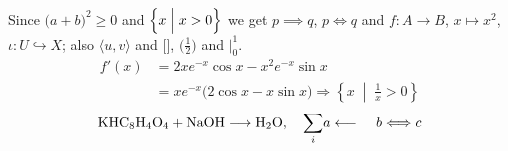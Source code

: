 \documentclass[11pt]{article}
\begin{document}
Since $\bigl(a+b\bigr)^2 \geq 0$ and $\Bigl\{x \Bigm| x>0\Bigr\}$ we get $p\implies q$, $p\iff q$ and $f\colon A\longrightarrow B$,
$x\mapsto x^2$, $\iota\colon U\hookrightarrow X$; also $\biggl\langle u, v\biggr\rangle$ and $\Biggl[\Biggr]$, {\small $\bigl(\frac{1}{2}\bigr)$ and $\Big|_{0}^{1}$}.
\begin{align*}
  f'(x) &= 2x e^{-x}\cos x - x^2 e^{-x}\sin x \\
        &= x e^{-x}\bigl(2\cos x - x\sin x\bigr) \Longrightarrow \left\{ x \;\middle|\; \frac{1}{x} > 0 \right\}
\end{align*}
\[ \mathrm{KHC_8H_4O_4} + \mathrm{NaOH} \longrightarrow \mathrm{H_2O}, \quad \smash[t]{\sum_{i}} a \longleftarrow \phantom{xy}\mathstrut b \Longleftrightarrow c \]
\end{document}
